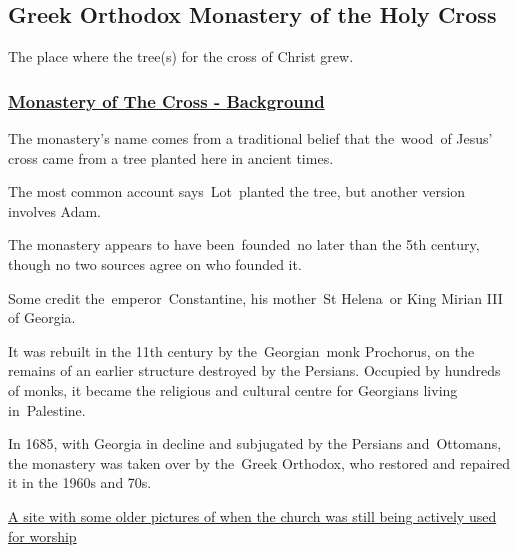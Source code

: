 \documentclass[letterpaper]{report}
\begin{document}
\clearpage
\subsection{Greek Orthodox Monastery of the Holy Cross}
The place where the tree(s) for the cross of Christ grew.

\subsubsection{
\href{http://www.seetheholyland.net/monastery-of-the-cross/}{
Monastery of The Cross - Background}}

The monastery’s name comes from a traditional belief that the wood of Jesus’ cross came from a tree planted here in ancient times.

The most common account says Lot planted the tree, but another version involves Adam.

The monastery appears to have been founded no later than the 5th century, though no two sources agree on who founded it.

Some credit the emperor Constantine, his mother St Helena or King Mirian III of Georgia.

It was rebuilt in the 11th century by the Georgian monk Prochorus, on the remains of an earlier structure destroyed by the Persians. Occupied by hundreds of monks, it became the religious and cultural centre for Georgians living in Palestine.

In 1685, with Georgia in decline and subjugated by the Persians and Ottomans, the monastery was taken over by the Greek Orthodox, who restored and repaired it in the 1960s and 70s.

\href{http://www.biblewalks.com/Sites/CrossMonastery.html}{
A site with some older pictures of when the church was still being actively used for worship}
\end{document}
